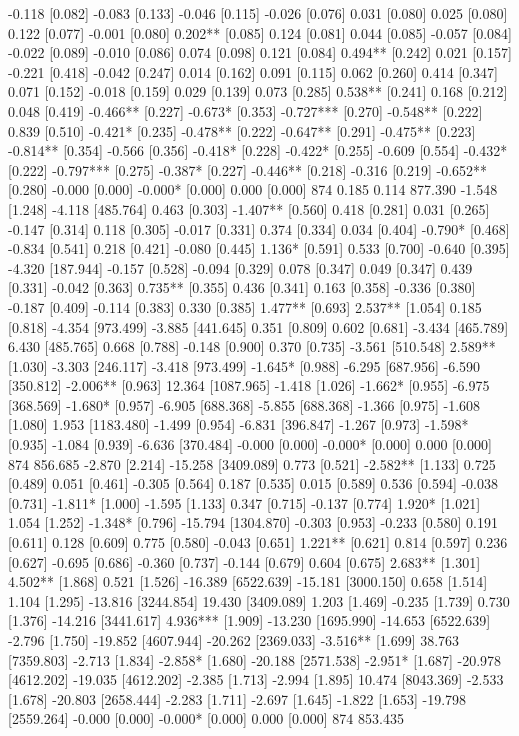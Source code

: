 -0.118 [0.082] -0.083 [0.133] -0.046 [0.115] -0.026 [0.076] 0.031 [0.080] 0.025 [0.080] 0.122 [0.077] -0.001 [0.080] 0.202** [0.085] 0.124 [0.081] 0.044 [0.085] -0.057 [0.084] -0.022 [0.089] -0.010 [0.086] 0.074 [0.098] 0.121 [0.084] 0.494** [0.242] 0.021 [0.157] -0.221 [0.418] -0.042 [0.247] 0.014 [0.162] 0.091 [0.115] 0.062 [0.260] 0.414 [0.347] 0.071 [0.152] -0.018 [0.159] 0.029 [0.139] 0.073 [0.285] 0.538** [0.241] 0.168 [0.212] 0.048 [0.419] -0.466** [0.227] -0.673* [0.353] -0.727*** [0.270] -0.548** [0.222] 0.839 [0.510] -0.421* [0.235] -0.478** [0.222] -0.647** [0.291] -0.475** [0.223] -0.814** [0.354] -0.566 [0.356] -0.418* [0.228] -0.422* [0.255] -0.609 [0.554] -0.432* [0.222] -0.797*** [0.275] -0.387* [0.227] -0.446** [0.218] -0.316 [0.219] -0.652** [0.280] -0.000 [0.000] -0.000* [0.000] 0.000 [0.000] 874 0.185 0.114 877.390 -1.548 [1.248] -4.118 [485.764] 0.463 [0.303] -1.407** [0.560] 0.418 [0.281] 0.031 [0.265] -0.147 [0.314] 0.118 [0.305] -0.017 [0.331] 0.374 [0.334] 0.034 [0.404] -0.790* [0.468] -0.834 [0.541] 0.218 [0.421] -0.080 [0.445] 1.136* [0.591] 0.533 [0.700] -0.640 [0.395] -4.320 [187.944] -0.157 [0.528] -0.094 [0.329] 0.078 [0.347] 0.049 [0.347] 0.439 [0.331] -0.042 [0.363] 0.735** [0.355] 0.436 [0.341] 0.163 [0.358] -0.336 [0.380] -0.187 [0.409] -0.114 [0.383] 0.330 [0.385] 1.477** [0.693] 2.537** [1.054] 0.185 [0.818] -4.354 [973.499] -3.885 [441.645] 0.351 [0.809] 0.602 [0.681] -3.434 [465.789] 6.430 [485.765] 0.668 [0.788] -0.148 [0.900] 0.370 [0.735] -3.561 [510.548] 2.589** [1.030] -3.303 [246.117] -3.418 [973.499] -1.645* [0.988] -6.295 [687.956] -6.590 [350.812] -2.006** [0.963] 12.364 [1087.965] -1.418 [1.026] -1.662* [0.955] -6.975 [368.569] -1.680* [0.957] -6.905 [688.368] -5.855 [688.368] -1.366 [0.975] -1.608 [1.080] 1.953 [1183.480] -1.499 [0.954] -6.831 [396.847] -1.267 [0.973] -1.598* [0.935] -1.084 [0.939] -6.636 [370.484] -0.000 [0.000] -0.000* [0.000] 0.000 [0.000] 874   856.685 -2.870 [2.214] -15.258 [3409.089] 0.773 [0.521] -2.582** [1.133] 0.725 [0.489] 0.051 [0.461] -0.305 [0.564] 0.187 [0.535] 0.015 [0.589] 0.536 [0.594] -0.038 [0.731] -1.811* [1.000] -1.595 [1.133] 0.347 [0.715] -0.137 [0.774] 1.920* [1.021] 1.054 [1.252] -1.348* [0.796] -15.794 [1304.870] -0.303 [0.953] -0.233 [0.580] 0.191 [0.611] 0.128 [0.609] 0.775 [0.580] -0.043 [0.651] 1.221** [0.621] 0.814 [0.597] 0.236 [0.627] -0.695 [0.686] -0.360 [0.737] -0.144 [0.679] 0.604 [0.675] 2.683** [1.301] 4.502** [1.868] 0.521 [1.526] -16.389 [6522.639] -15.181 [3000.150] 0.658 [1.514] 1.104 [1.295] -13.816 [3244.854] 19.430 [3409.089] 1.203 [1.469] -0.235 [1.739] 0.730 [1.376] -14.216 [3441.617] 4.936*** [1.909] -13.230 [1695.990] -14.653 [6522.639] -2.796 [1.750] -19.852 [4607.944] -20.262 [2369.033] -3.516** [1.699] 38.763 [7359.803] -2.713 [1.834] -2.858* [1.680] -20.188 [2571.538] -2.951* [1.687] -20.978 [4612.202] -19.035 [4612.202] -2.385 [1.713] -2.994 [1.895] 10.474 [8043.369] -2.533 [1.678] -20.803 [2658.444] -2.283 [1.711] -2.697 [1.645] -1.822 [1.653] -19.798 [2559.264] -0.000 [0.000] -0.000* [0.000] 0.000 [0.000] 874   853.435
